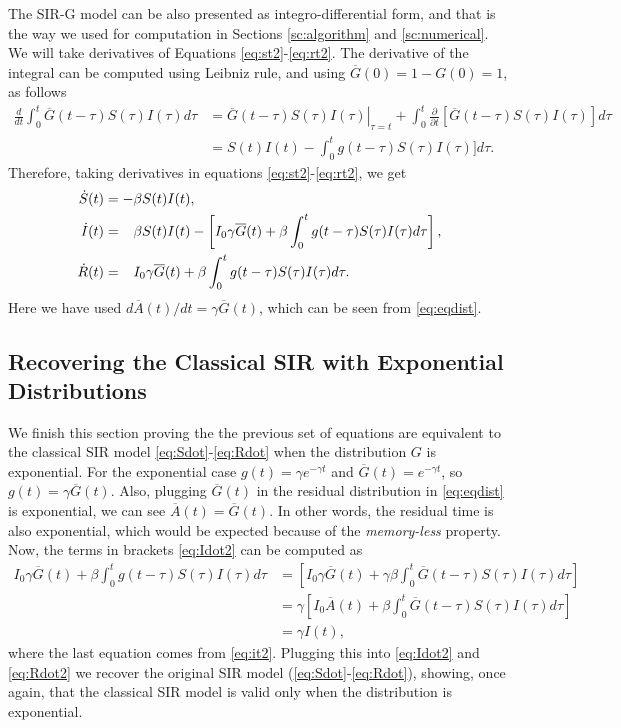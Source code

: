 \documentclass[twoside,USenglish,10pt]{article}
\newcommand{\Ab}{\overline{A}\xspace}
\newcommand{\Gb}{\overline{G}\xspace}
\newcommand{\phm}{\ensuremath\phantom{-}\xspace}
\begin{document}
The SIR-G model can be also presented as integro-differential form, and that is the way we used for computation in Sections \ref{sc:algorithm} and \ref{sc:numerical}. We will take derivatives of Equations \eqref{eq:st2}-\eqref{eq:rt2}. The derivative of the integral can be computed using Leibniz rule, and using $\Gb(0)=1-G(0)=1$, as follows
\begin{align*}
	\frac{d}{dt}\int_0^t \Gb(t-\tau) S(\tau)I(\tau)d\tau
	&= \left. \Gb(t-\tau) S(\tau)I(\tau) \right|_{\tau=t}
	 + \int_0^t \frac{\partial}{\partial t} [\Gb(t-\tau) S(\tau)I(\tau)]d\tau \\
	&= S(t)I(t) -  \int_0^t g(t-\tau) S(\tau)I(\tau)]d\tau.
\end{align*}
Therefore, taking derivatives in equations \eqref{eq:st2}-\eqref{eq:rt2}, we get
\begin{subequations}
	\begin{align}
		\dot S(t) &= -\beta S(t)I(t), 
		\label{eq:Sdot2} \\
		\dot I(t) &= \phm  \beta  S(t)I(t) - \left[ I_0 \gamma \Gb(t) +  \beta\int_0^t g(t-\tau) S(\tau)I(\tau)d\tau \right],
		\label{eq:Idot2} \\
		\dot R(t) &= \phm I_0 \gamma \Gb(t) + \beta\int_0^t g(t-\tau) S(\tau)I(\tau)d\tau.
		\label{eq:Rdot2}
	\end{align}
\end{subequations}
Here we have used $d\Ab(t)/dt=\gamma\Gb(t)$, which  can be seen from \eqref{eq:eqdist}.


\subsection{Recovering the Classical SIR with Exponential Distributions}

We finish this section proving the the previous set of equations are equivalent to the classical SIR model \eqref{eq:Sdot}-\eqref{eq:Rdot} when the distribution $G$ is exponential. 
For the exponential case  $g(t)=\gamma e^{-\gamma t}$ and $\Gb(t)=e^{-\gamma t}$, so $g(t)=\gamma\Gb(t)$. Also, plugging $\Gb(t)$ in the residual distribution in \eqref{eq:eqdist} is exponential, we can see $\Ab(t) = \Gb(t)$. In other words, the residual time is also exponential, which would be expected because of the \textit{memory-less} property.
Now, the terms in brackets \eqref{eq:Idot2} can be computed as 
\begin{align}
I_0 \gamma \Gb(t) + \beta\int_0^t g(t-\tau) S(\tau)I(\tau)d\tau 
&= \left[ I_0  \gamma\Gb(t) + \gamma\beta\int_0^t \Gb(t-\tau) S(\tau)I(\tau)d\tau \right]\\
&= \gamma\left[ I_0  \Ab(t) + \beta\int_0^t \Gb(t-\tau) S(\tau)I(\tau)d\tau \right]\\
&= \gamma I(t),
\end{align}
where the last equation comes from \eqref{eq:it2}.
Plugging this into \eqref{eq:Idot2} and \eqref{eq:Rdot2} we recover the original SIR model (\eqref{eq:Sdot}-\eqref{eq:Rdot}), showing, once again, that the classical SIR model is valid only when the distribution is exponential.
\end{document}

